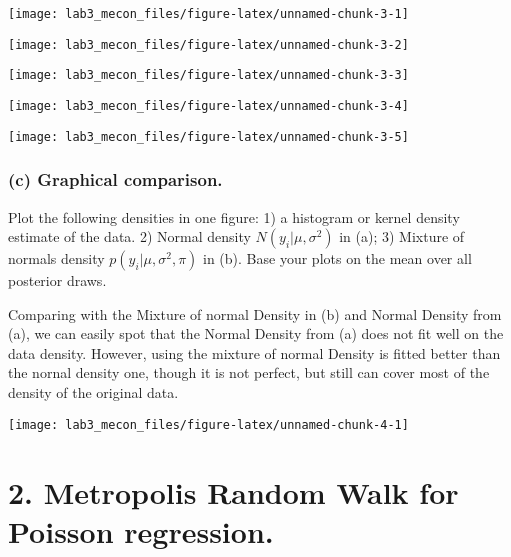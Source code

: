 \documentclass[]{article}
\begin{document}
\begin{center}\texttt{[image: lab3\_mecon\_files/figure-latex/unnamed-chunk-3-1]} \end{center}

\begin{center}\texttt{[image: lab3\_mecon\_files/figure-latex/unnamed-chunk-3-2]} \end{center}

\begin{center}\texttt{[image: lab3\_mecon\_files/figure-latex/unnamed-chunk-3-3]} \end{center}

\begin{center}\texttt{[image: lab3\_mecon\_files/figure-latex/unnamed-chunk-3-4]} \end{center}

\begin{center}\texttt{[image: lab3\_mecon\_files/figure-latex/unnamed-chunk-3-5]} \end{center}

\hypertarget{c-graphical-comparison.}{%
\subsubsection{(c) Graphical
comparison.}\label{c-graphical-comparison.}}

Plot the following densities in one figure: 1) a histogram or kernel
density estimate of the data. 2) Normal density
\(N(y_i |\mu, \sigma^2 )\) in (a); 3) Mixture of normals density
\(p(y_i |\mu, \sigma^2 , \pi)\) in (b). Base your plots on the mean over
all posterior draws.

Comparing with the Mixture of normal Density in (b) and Normal Density
from (a), we can easily spot that the Normal Density from (a) does not
fit well on the data density. However, using the mixture of normal
Density is fitted better than the nornal density one, though it is not
perfect, but still can cover most of the density of the original data.

\begin{center}\texttt{[image: lab3\_mecon\_files/figure-latex/unnamed-chunk-4-1]} \end{center}

\hypertarget{metropolis-random-walk-for-poisson-regression.}{%
\section{2. Metropolis Random Walk for Poisson
regression.}\label{metropolis-random-walk-for-poisson-regression.}}
\end{document}
